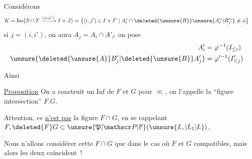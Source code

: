 Considérons
\[
 K=\operatorname{Im}\bigl(S\cap T\xrightarrow{(\varphi,\varphi')} I\times J\bigr)
 =\bigl\{(i,j')\in I\times I'\mid A_i^\circ\cap \deleted{\unsure{B}}\unsure{A_{i'}^{\prime\circ}|B_{j'}^{\prime\circ}}\ne\phi\bigr\}
\]
si $j=(i,i')$, on aura $\boxed{A_j=A_i\cap A'_{i'}}$
 on pose
\[
 \begin{aligned}
 A_i'&=\varphi^{-1}(I_{\leq i})\\
 \unsure{\deleted{\unsure{A}}B_j'|\deleted{\unsure{B}}A_j'}&=\varphi^{\prime-1}(I'_{\leq j})
 \end{aligned}
\]



Ainsi

\uline{Proposition} On a construit un Inf de $F$ et $G$ pour $\ll$, on l'appelle la ``figure intersection'' $F.G$.

Attention, ce \uline{n'est pas}  la figure $F\cap G$,  en se rappelant $F,\deleted{F}G\subset\unsure{\mathfrak P|\mathscr P|\mathbb P}(\unsure{L,|L_1|L})$, 

Nous n'allons considérer cette $F\cap G$ que dans le cas où $F$ et $G$ compatibles, mais alors les deux coïncident~!

